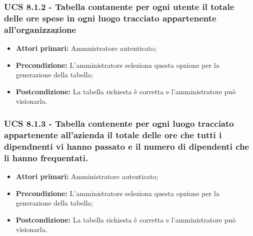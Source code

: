 \subsubsection{UCS 8.1.2 - Tabella contanente per ogni utente il totale delle ore spese in ogni luogo tracciato appartenente all'organizzazione}%
\begin{itemize}
\item \textbf{Attori primari:} Ammnistratore autenticato;
\item \textbf{Precondizione:} L'amministratore seleziona questa opzione per la generazione della tabella;
\item \textbf{Postcondizione:} La tabella richiesta è corretta e l'amministratore può visionarla.
\end{itemize}

\subsubsection{UCS 8.1.3 - Tabella contenente per ogni luogo tracciato appartenente all'azienda il totale delle ore che tutti i dipendnenti vi hanno passato e il numero di dipendenti che li hanno frequentati.}%
\begin{itemize}
\item \textbf{Attori primari:} Amministratore autenticato;
\item \textbf{Precondizione:} L'amministratore seleziona questa opzione per la generazione della tabella;
\item \textbf{Postcondizione:} La tabella richiesta è corretta e l'amministratore può visionarla.
\end{itemize}

